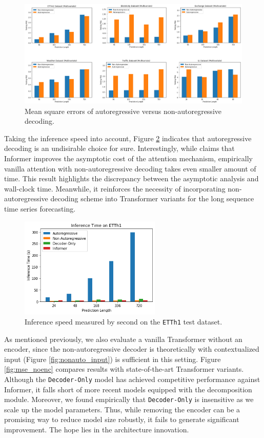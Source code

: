 \begin{figure}
    \centering
    \includegraphics[width=\textwidth]{img/mse_nonauto.png}
    \caption{Mean square errors of autoregressive versus non-autoregressive decoding.}
    \label{fig:mse_nonauto}
\end{figure}

Taking the inference speed into account, Figure \ref{fig:nonauto_time} indicates that autoregressive decoding is an undisirable choice for sure. 
Interestingly, while \citet{https://doi.org/10.48550/arxiv.2012.07436} claims that Informer improves the asymptotic cost of the attention mechanism, empirically vanilla attention with non-autoregressive decoding takes even smaller amount of time. 
This result highlights the discrepancy between the asymptotic analysis and wall-clock time. 
Meanwhile, it reinforces the necessity of incorporating non-autoregressive decoding scheme into Transformer variants for the long sequence time series forecasting. 

\begin{figure}
    \centering
    \includegraphics[width=0.6\textwidth]{img/nonauto_time.png}
    \caption{Inference speed measured by second on the \texttt{ETTh1} test dataset.}
    \label{fig:nonauto_time}
\end{figure}

As mentioned previously, we also evaluate a vanilla Transformer without an encoder, since the non-autoregressive decoder is theoretically with contextualized input (Figure \ref{fig:nonauto_input}) is sufficient in this setting. 
Figure \ref{fig:mse_noenc} compares results with state-of-the-art Transformer variants. 
Although the \texttt{Decoder-Only} model has achieved competitive performance against Informer, it falls short of more recent models equipped with the decomposition module. 
Moreover, we found empirically that \texttt{Decoder-Only} is insensitive as we scale up the model parameters. 
Thus, while removing the encoder can be a promising way to reduce model size robustly, it fails to generate significant improvement. 
The hope lies in the architecture innovation. 

